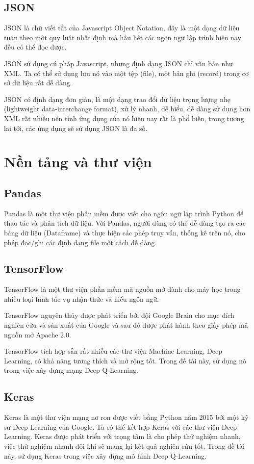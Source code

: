 \subsection{JSON}
JSON là chữ viết tắt của Javascript Object Notation, đây là một dạng
dữ liệu tuân theo một quy luật nhất định mà hầu hết các ngôn ngữ
lập trình hiện nay đều có thể đọc được.

JSON sử dụng cú pháp Javascript, nhưng định dạng JSON chỉ văn bản như
XML. Ta có thể sử dụng lưu nó vào một tệp (file), một bản ghi (record)
trong cơ sở dữ liệu rất dễ dàng.

JSON có định dạng đơn giản, là một dạng trao đổi dữ liệu trọng lượng
nhẹ (lightweight data-interchange format), xử lý nhanh, dễ hiểu,
dễ dàng sử dụng hơn XML rất nhiều nên tính ứng dụng của nó hiện nay
rất là phổ biến, trong tương lai tới, các ứng dụng sẽ sử dụng JSON
là đa số.

\section{Nền tảng và thư viện}

\subsection{Pandas}
Pandas là một thư viện phần mềm được viết cho ngôn ngữ lập trình
Python để thao tác và phân tích dữ liệu. Với Pandas, người dùng
có thể dễ dàng tạo ra các bảng dữ liệu (Dataframe) và thực hiện
các phép truy vấn, thống kê trên nó, cho phép đọc/ghi các
định dạng file một cách dễ dàng.

\subsection{TensorFlow}
TensorFlow là một thư viện phần mềm mã nguồn mở dành cho máy học
trong nhiều loại hình tác vụ nhận thức và hiểu ngôn ngữ.

TensorFlow nguyên thủy được phát triển bởi đội Google Brain cho
mục đích nghiên cứu và sản xuất của Google và sau đó được phát hành
theo giấy phép mã nguồn mở Apache 2.0.

TensorFlow tích hợp sẵn rất nhiều các thư viện Machine Learning,
Deep Learning, có khả năng tương thích và mở rộng tốt. Trong đề tài
này, sử dụng nó trong việc xây dựng mạng Deep Q-Learning.

\subsection{Keras}
Keras là một thư viện mạng nơ ron được viết bằng Python năm 2015 bởi
một kỹ sư Deep Learning của Google. Ta có thể kết hợp Keras với các
thư viện Deep Learning. Keras được phát triển với trọng tâm là
cho phép thử nghiệm nhanh, việc thử nghiệm nhanh đôi khi sẽ mang lại
kết quả nghiên cứu tốt. Trong đề tài này, sử dụng Keras trong việc
xây dựng mô hình Deep Q-Learning.

